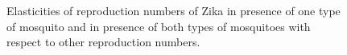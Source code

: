 \documentclass{ws-rv9x6}
\begin{document}
\begin{figure}[H]%
    \centering
    \qquad
    \qquad
    \caption{Elasticities of reproduction numbers of Zika in presence of one type of mosquito and in presence of both types of mosquitoes with respect to other reproduction numbers.}
    \label{fig:elasticities3}%
\end{figure} 
  
\end{document}
